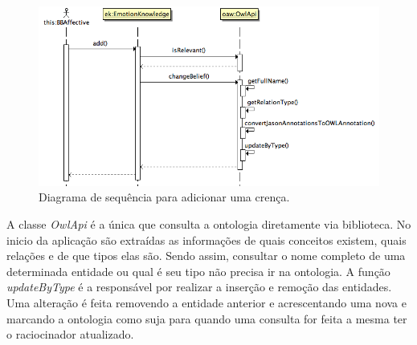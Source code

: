 \begin{figure}
  \centering
  \includegraphics[width=12cm]{figuras/shareBelief.png}
  \caption{Diagrama de sequência para adicionar uma crença.}
  \label{fig:shareBelief}
\end{figure}

A classe \emph{OwlApi} é a única que consulta a ontologia diretamente via
biblioteca. No inicio da aplicação são extraídas as informações de quais
conceitos existem, quais relações e de que tipos elas são. Sendo assim,
consultar o nome completo de uma determinada entidade ou qual é seu tipo não
precisa ir na ontologia. A função \emph{updateByType} é a responsável por
realizar a inserção e remoção das entidades. Uma alteração é feita removendo
a entidade anterior e acrescentando uma nova e marcando a ontologia como suja
para quando uma consulta for feita a mesma ter o raciocinador atualizado.

